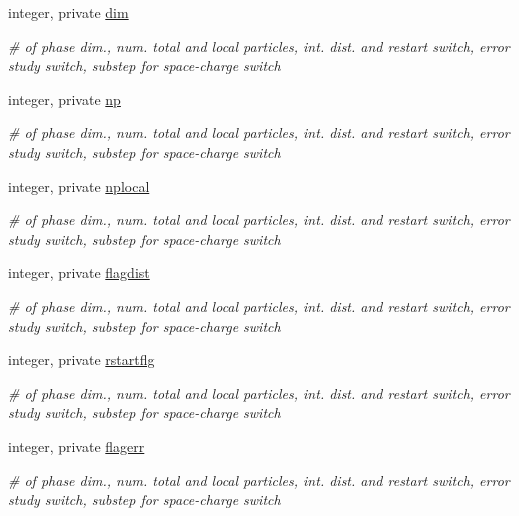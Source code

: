 \begin{DoxyCompactItemize}
\item 
integer, private \mbox{\hyperlink{namespaceaccsimulatorclass_a26217a3bed78a53045dc70c1ac59207a}{dim}}
\begin{DoxyCompactList}\small\item\em \# of phase dim., num. total and local particles, int. dist. and restart switch, error study switch, substep for space-\/charge switch \end{DoxyCompactList}\item 
integer, private \mbox{\hyperlink{namespaceaccsimulatorclass_a1149425f2a1942ae90449ee7a0a06fe0}{np}}
\begin{DoxyCompactList}\small\item\em \# of phase dim., num. total and local particles, int. dist. and restart switch, error study switch, substep for space-\/charge switch \end{DoxyCompactList}\item 
integer, private \mbox{\hyperlink{namespaceaccsimulatorclass_a673e05862dc992db1e5f59ae966a1bc6}{nplocal}}
\begin{DoxyCompactList}\small\item\em \# of phase dim., num. total and local particles, int. dist. and restart switch, error study switch, substep for space-\/charge switch \end{DoxyCompactList}\item 
integer, private \mbox{\hyperlink{namespaceaccsimulatorclass_a487e5f5861f9d6613a37837a38e8a2c0}{flagdist}}
\begin{DoxyCompactList}\small\item\em \# of phase dim., num. total and local particles, int. dist. and restart switch, error study switch, substep for space-\/charge switch \end{DoxyCompactList}\item 
integer, private \mbox{\hyperlink{namespaceaccsimulatorclass_af704d398708fe866be2cd6b2f2705267}{rstartflg}}
\begin{DoxyCompactList}\small\item\em \# of phase dim., num. total and local particles, int. dist. and restart switch, error study switch, substep for space-\/charge switch \end{DoxyCompactList}\item 
integer, private \mbox{\hyperlink{namespaceaccsimulatorclass_aeed14cf632798f53deb7a49d73f7d09f}{flagerr}}
\begin{DoxyCompactList}\small\item\em \# of phase dim., num. total and local particles, int. dist. and restart switch, error study switch, substep for space-\/charge switch \end{DoxyCompactList}\end{DoxyCompactItemize}

